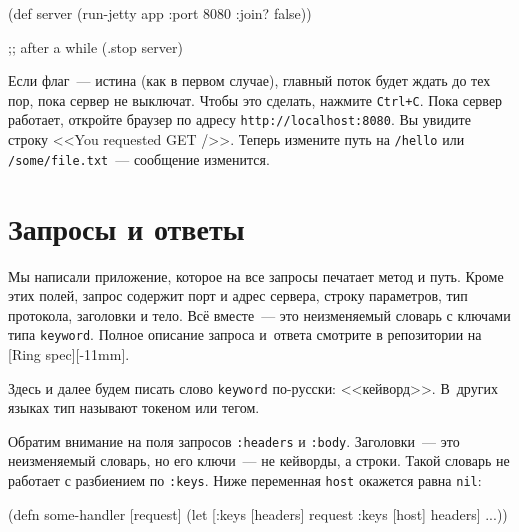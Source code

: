 \else

\begin{english}
  \begin{clojure}
(def server
  (run-jetty app {:port 8080 :join? false}))

;; after a while
(.stop server)
  \end{clojure}
\end{english}

\fi

Если флаг~--- истина (как в первом случае), главный поток будет ждать до тех
пор, пока сервер не выключат. Чтобы это сделать, нажмите \verb|Ctrl+C|. Пока
сервер работает, откройте браузер по адресу \verb|http://localhost:8080|. Вы
увидите строку <<You requested GET />>. Теперь измените путь на \verb|/hello|
или \verb|/some/file.txt|~--- сообщение изменится.

\section{Запросы и ответы}

Мы написали приложение, которое на все запросы печатает метод и путь. Кроме этих
полей, запрос содержит порт и адрес сервера, строку параметров, тип протокола,
заголовки и тело. Всё вместе~--- это неизменяемый словарь с ключами типа
\verb|keyword|. Полное описание запроса и~ответа смотрите в репозитории на
[Ring spec][-11mm].

Здесь и далее будем писать слово \verb|keyword| по-русски:
<<кейворд>>. В~других языках тип называют токеном или тегом.


\mnoindent
Обратим внимание на поля запросов \verb|:headers| и \verb|:body|. Заголовки~---
это неизменяемый словарь, но его ключи~--- не кейворды, а строки. Такой словарь не
работает с разбиением по \verb|:keys|. Ниже переменная \verb|host| окажется
равна \verb|nil|:


\begin{english}
  \begin{clojure}
(defn some-handler
  [request]
  (let [{:keys [headers]} request
        {:keys [host]} headers]
    ...))
  \end{clojure}
\end{english}


